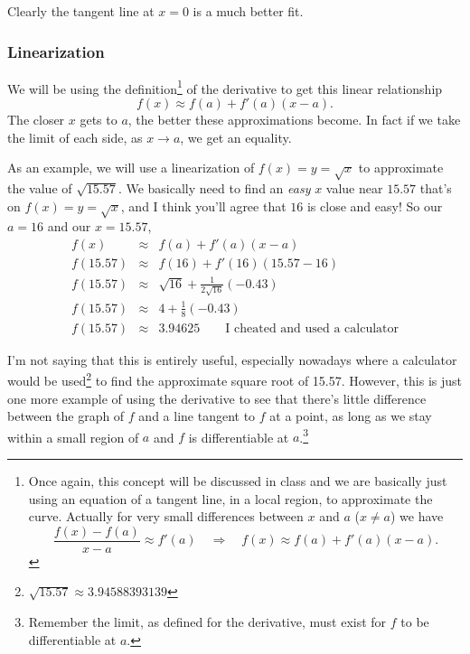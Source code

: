 \documentclass[12pt,addpoints, answers, fleqn]{exam}
\begin{document}
Clearly the tangent line at $x=0$ is a much better fit.


\subsubsection{Linearization}


We will be using the definition\footnote{Once again, this concept will be discussed in class and we are basically just using an equation of a tangent line, in a local region, to approximate the curve. Actually for very small differences between $x$ and $a$ ($x \neq a$) we have
\[
\frac{f \left( x \right) - f \left( a \right)}{x - a} \approx f' \left( a \right) \quad \Rightarrow \quad f \left( x \right) \approx f \left( a  \right) + f' \left( a  \right) \left( x - a \right).
\]}  of the derivative to get this linear relationship
\[
f \left( x \right) \approx f \left( a  \right) + f' \left( a  \right) \left( x - a \right).
\]
The closer $x$ gets to $a$, the better these approximations become. In fact if we take the limit of each side, as $x \rightarrow a$, we get an equality.



As an example, we will use a linearization of $f \left( x \right)=y=\sqrt{x}$ to approximate the value of $\sqrt{15.57}$. We basically need to find an \emph{easy} $x$ value near $15.57$ that's on $f \left( x \right)=y=\sqrt{x}$, and I think you'll agree that $16$ is close and easy! So our $a=16$ and our $x=15.57$,
\begin{eqnarray*}
f \left( x \right) &\approx& f \left( a  \right) + f' \left( a  \right) \left( x - a \right)\\
f \left( 15.57 \right) &\approx& f \left( 16  \right) + f' \left( 16  \right) \left( 15.57 - 16 \right)\\
f \left( 15.57 \right) &\approx& \sqrt{16} + \frac{1}{2\sqrt{16}} \left( -0.43 \right)\\
f \left( 15.57 \right) &\approx& 4 + \frac{1}{8} \left( -0.43 \right)\\
f \left( 15.57 \right) &\approx& 3.94625 \qquad{\mbox{I cheated and used a calculator}}
\end{eqnarray*}

I'm not saying that this is entirely useful, especially nowadays where a calculator would be used\footnote{$\sqrt{15.57} \approx 3.94588393139$} to find the approximate square root of 15.57. However, this is just one more example of using the derivative to see that there's little difference between the graph of $f$ and a line tangent to $f$ at a point, as long as we stay within a small region of $a$ and $f$ is differentiable at $a$.\footnote{Remember the limit, as defined for the derivative, must exist for $f$ to be differentiable at $a$.}
\end{document}
